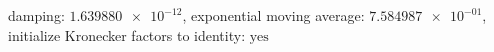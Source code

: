 damping: $\num[scientific-notation=true]{1.639880e-12}$, exponential moving average: $\num[scientific-notation=true]{7.584987e-01}$, initialize Kronecker factors to identity: $\text{yes}$
